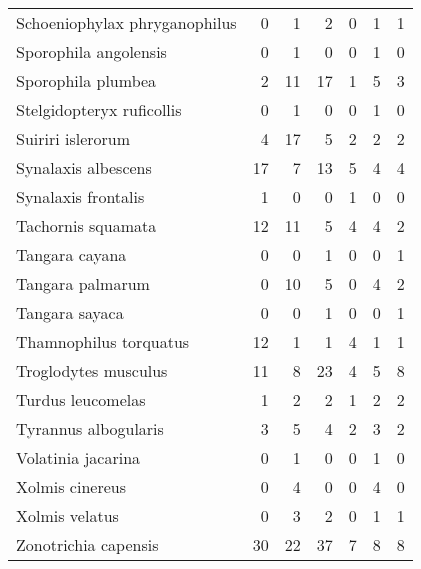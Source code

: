 \begin{table}[ht]
\begin{tabular}{lrrrrrr}
  Schoeniophylax phryganophilus & 0 & 1 & 2 & 0 & 1 & 1 \\ 
  Sporophila angolensis & 0 & 1 & 0 & 0 & 1 & 0 \\ 
  Sporophila plumbea & 2 & 11 & 17 & 1 & 5 & 3 \\ 
  Stelgidopteryx ruficollis & 0 & 1 & 0 & 0 & 1 & 0 \\ 
  Suiriri islerorum & 4 & 17 & 5 & 2 & 2 & 2 \\ 
  Synalaxis albescens & 17 & 7 & 13 & 5 & 4 & 4 \\ 
  Synalaxis frontalis & 1 & 0 & 0 & 1 & 0 & 0 \\ 
  Tachornis squamata & 12 & 11 & 5 & 4 & 4 & 2 \\ 
  Tangara cayana & 0 & 0 & 1 & 0 & 0 & 1 \\ 
  Tangara palmarum & 0 & 10 & 5 & 0 & 4 & 2 \\ 
  Tangara sayaca & 0 & 0 & 1 & 0 & 0 & 1 \\ 
  Thamnophilus torquatus & 12 & 1 & 1 & 4 & 1 & 1 \\ 
  Troglodytes musculus & 11 & 8 & 23 & 4 & 5 & 8 \\ 
  Turdus leucomelas & 1 & 2 & 2 & 1 & 2 & 2 \\ 
  Tyrannus albogularis & 3 & 5 & 4 & 2 & 3 & 2 \\ 
  Volatinia jacarina & 0 & 1 & 0 & 0 & 1 & 0 \\ 
  Xolmis cinereus & 0 & 4 & 0 & 0 & 4 & 0 \\ 
  Xolmis velatus & 0 & 3 & 2 & 0 & 1 & 1 \\ 
  Zonotrichia capensis & 30 & 22 & 37 & 7 & 8 & 8 \\ 
   \hline
\end{tabular}
\end{table}
